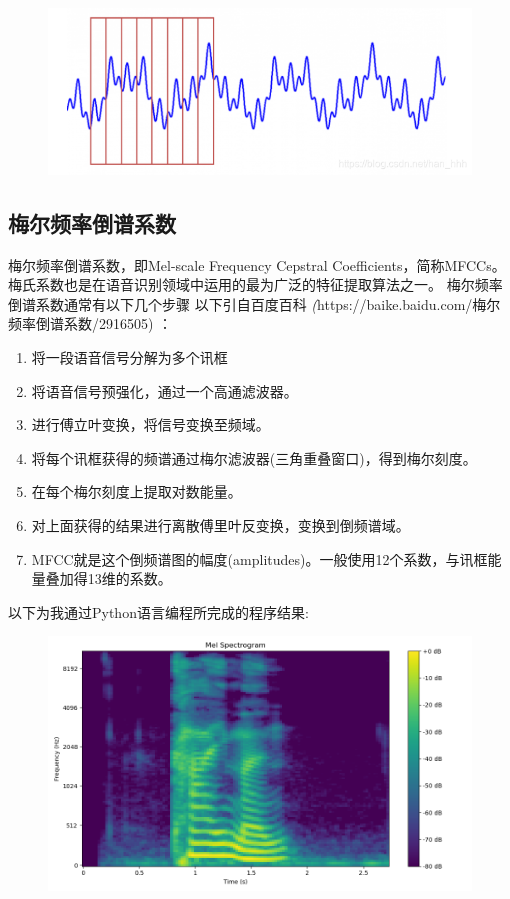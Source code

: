 \documentclass[lang=cn]{elegantpaper}
\begin{document}
\begin{figure}[h]
    \centering
    \includegraphics[scale=0.4]{STFT.png}
\end{figure}

\subsection{梅尔频率倒谱系数}
梅尔频率倒谱系数，即Mel-scale Frequency Cepstral Coefficients，简称MFCCs。梅氏系数也是在语音识别领域中运用的最为广泛的特征提取算法之一。
梅尔频率倒谱系数通常有以下几个步骤 以下引自百度百科 \textit(https://baike.baidu.com/梅尔频率倒谱系数/2916505) ：

\begin{enumerate}
    \item 将一段语音信号分解为多个讯框
    \item 将语音信号预强化，通过一个高通滤波器。
    \item 进行傅立叶变换，将信号变换至频域。
    \item 将每个讯框获得的频谱通过梅尔滤波器(三角重叠窗口)，得到梅尔刻度。
    \item 在每个梅尔刻度上提取对数能量。
    \item 对上面获得的结果进行离散傅里叶反变换，变换到倒频谱域。
    \item MFCC就是这个倒频谱图的幅度(amplitudes)。一般使用12个系数，与讯框能量叠加得13维的系数。
\end{enumerate}

以下为我通过Python语言编程所完成的程序结果:
\begin{figure}[h]
    \centering
    \includegraphics[scale=0.4]{MFCC.png}
\end{figure}
\end{document}
